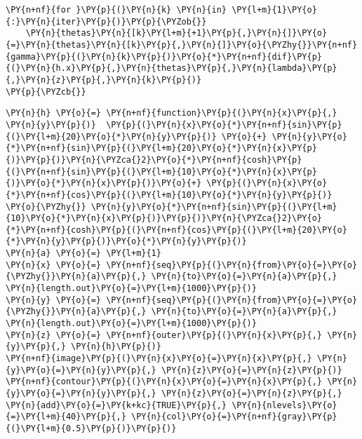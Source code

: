     \begin{tcolorbox}[breakable, size=fbox, boxrule=1pt, pad at break*=1mm,colback=cellbackground, colframe=cellborder]
\begin{Verbatim}[commandchars=\\\{\}]
\PY{n+nf}{for }\PY{p}{(}\PY{n}{k} \PY{n}{in} \PY{l+m}{1}\PY{o}{:}\PY{n}{iter}\PY{p}{)}\PY{p}{\PYZob{}}
    \PY{n}{thetas}\PY{n}{[k}\PY{l+m}{+1}\PY{p}{,}\PY{n}{]}\PY{o}{=}\PY{n}{thetas}\PY{n}{[k}\PY{p}{,}\PY{n}{]}\PY{o}{\PYZhy{}}\PY{n+nf}{gamma}\PY{p}{(}\PY{n}{k}\PY{p}{)}\PY{o}{*}\PY{n+nf}{dif}\PY{p}{(}\PY{n}{h.x}\PY{p}{,}\PY{n}{thetas}\PY{p}{,}\PY{n}{lambda}\PY{p}{,}\PY{n}{z}\PY{p}{,}\PY{n}{k}\PY{p}{)}
\PY{p}{\PYZcb{}}
\end{Verbatim}
\end{tcolorbox}

    \begin{tcolorbox}[breakable, size=fbox, boxrule=1pt, pad at break*=1mm,colback=cellbackground, colframe=cellborder]
\begin{Verbatim}[commandchars=\\\{\}]
\PY{n}{h} \PY{o}{=} \PY{n+nf}{function}\PY{p}{(}\PY{n}{x}\PY{p}{,} \PY{n}{y}\PY{p}{)}  \PY{p}{(}\PY{n}{x}\PY{o}{*}\PY{n+nf}{sin}\PY{p}{(}\PY{l+m}{20}\PY{o}{*}\PY{n}{y}\PY{p}{)} \PY{o}{+} \PY{n}{y}\PY{o}{*}\PY{n+nf}{sin}\PY{p}{(}\PY{l+m}{20}\PY{o}{*}\PY{n}{x}\PY{p}{)}\PY{p}{)}\PY{n}{\PYZca{}2}\PY{o}{*}\PY{n+nf}{cosh}\PY{p}{(}\PY{n+nf}{sin}\PY{p}{(}\PY{l+m}{10}\PY{o}{*}\PY{n}{x}\PY{p}{)}\PY{o}{*}\PY{n}{x}\PY{p}{)}\PY{o}{+} \PY{p}{(}\PY{n}{x}\PY{o}{*}\PY{n+nf}{cos}\PY{p}{(}\PY{l+m}{10}\PY{o}{*}\PY{n}{y}\PY{p}{)} \PY{o}{\PYZhy{}} \PY{n}{y}\PY{o}{*}\PY{n+nf}{sin}\PY{p}{(}\PY{l+m}{10}\PY{o}{*}\PY{n}{x}\PY{p}{)}\PY{p}{)}\PY{n}{\PYZca{}2}\PY{o}{*}\PY{n+nf}{cosh}\PY{p}{(}\PY{n+nf}{cos}\PY{p}{(}\PY{l+m}{20}\PY{o}{*}\PY{n}{y}\PY{p}{)}\PY{o}{*}\PY{n}{y}\PY{p}{)}
\PY{n}{a} \PY{o}{=} \PY{l+m}{1}
\PY{n}{x} \PY{o}{=} \PY{n+nf}{seq}\PY{p}{(}\PY{n}{from}\PY{o}{=}\PY{o}{\PYZhy{}}\PY{n}{a}\PY{p}{,} \PY{n}{to}\PY{o}{=}\PY{n}{a}\PY{p}{,} \PY{n}{length.out}\PY{o}{=}\PY{l+m}{1000}\PY{p}{)}
\PY{n}{y} \PY{o}{=} \PY{n+nf}{seq}\PY{p}{(}\PY{n}{from}\PY{o}{=}\PY{o}{\PYZhy{}}\PY{n}{a}\PY{p}{,} \PY{n}{to}\PY{o}{=}\PY{n}{a}\PY{p}{,} \PY{n}{length.out}\PY{o}{=}\PY{l+m}{1000}\PY{p}{)}
\PY{n}{z} \PY{o}{=} \PY{n+nf}{outer}\PY{p}{(}\PY{n}{x}\PY{p}{,} \PY{n}{y}\PY{p}{,} \PY{n}{h}\PY{p}{)}
\PY{n+nf}{image}\PY{p}{(}\PY{n}{x}\PY{o}{=}\PY{n}{x}\PY{p}{,} \PY{n}{y}\PY{o}{=}\PY{n}{y}\PY{p}{,} \PY{n}{z}\PY{o}{=}\PY{n}{z}\PY{p}{)}
\PY{n+nf}{contour}\PY{p}{(}\PY{n}{x}\PY{o}{=}\PY{n}{x}\PY{p}{,} \PY{n}{y}\PY{o}{=}\PY{n}{y}\PY{p}{,} \PY{n}{z}\PY{o}{=}\PY{n}{z}\PY{p}{,} \PY{n}{add}\PY{o}{=}\PY{k+kc}{TRUE}\PY{p}{,} \PY{n}{nlevels}\PY{o}{=}\PY{l+m}{40}\PY{p}{,} \PY{n}{col}\PY{o}{=}\PY{n+nf}{gray}\PY{p}{(}\PY{l+m}{0.5}\PY{p}{)}\PY{p}{)}

\end{Verbatim}
\end{tcolorbox}
